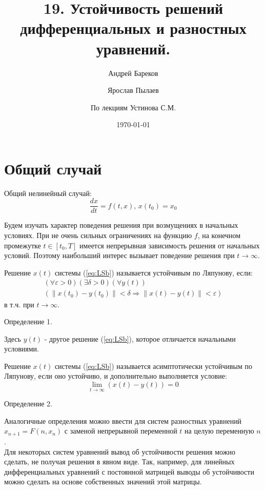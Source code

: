 \documentclass[a4paper,11pt]{article}
\title{19. Устойчивость решений дифференциальных и разностных уравнений.}
\author{Андрей Бареков \and Ярослав Пылаев \and По лекциям Устинова С.М.}
\date{\today}
\begin{document}
\maketitle
\newpage

\section{Общий случай}
\begin{importantblock}
  Общий нелинейный случай:
  \begin{equation}
    \frac{dx}{dt} = f(t, x),\, x(t_0) = x_0
    \label{eq:LSb}
  \end{equation}
\end{importantblock}
Будем изучать характер поведения решения при возмущениях в начальных условиях. При не очень сильных ограничениях на функцию $f$, на конечном промежутке
  $t \in [t_0, T]$ имеется непрерывная зависимость решения от начальных условий. Поэтому наибольший интерес вызывает поведение решения при $t \rightarrow \infty$.

\begin{importantblock}
  Решение $x(t)$ системы (\ref{eq:LSb}) называется устойчивым по Ляпунову, если:
  \begin{gather*}
    (\forall \varepsilon > 0)(\exists \delta > 0)(\forall y(t)) \\
    (\|x(t_0)-y(t_0)\| < \delta \Rightarrow \|x(t)-y(t)\| < \varepsilon)
  \end{gather*}
  в т.ч. при $t \rightarrow \infty$.
\end{importantblock}
\begin{center}
  \small{Определение 1.}
\end{center}
Здесь $y(t)$ - другое решение (\ref{eq:LSb}), которое отличается начальными условиями.
\begin{importantblock}
  Решение $x(t)$ системы (\ref{eq:LSb}) называется асимптотически устойчивым по Ляпунову, если оно устойчиво, и дополнительно выполняется условие:
  \[\lim_{t \to \infty}(x(t) - y(t)) = 0\]
\end{importantblock}
\begin{center}
  \small{Определение 2.}
\end{center}
Аналогичные определения можно ввести для систем разностных уравнений \(x_{n+1} = F(n, x_n)\) с заменой непрерывной переменной $t$ на целую переменную $n$. \\
Для некоторых систем уравнений вывод об устойчивости решения можно сделать, не получая решения в явном виде. Так, например, для линейных дифференциальных уравнений
  с постоянной матрицей выводы об устойчивости можно сделать на основе собственных значений этой матрицы.
\end{document}

